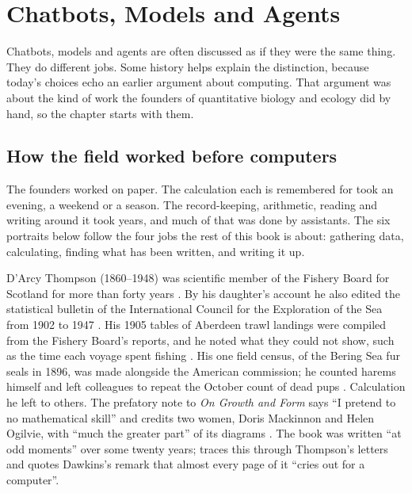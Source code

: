 \chapter{Chatbots, Models and Agents}
\label{ch:landscape}

Chatbots, models and agents are often discussed as if they were the same thing.
They do different jobs. Some history helps explain the distinction, because
today's choices echo an earlier argument about computing. That argument was
about the kind of work the founders of quantitative biology and ecology did by
hand, so the chapter starts with them.

\section{How the field worked before computers}

The founders worked on paper. The calculation each is remembered for took an
evening, a weekend or a season. The record-keeping, arithmetic, reading and
writing around it took years, and much of that was done by assistants. The six
portraits below follow the four jobs the rest of this book is about: gathering
data, calculating, finding what has been written, and writing it up.

D'Arcy Thompson (1860--1948) was scientific member of the Fishery Board for
Scotland for more than forty years \parencite{lt1958scholarnaturalist}. By his
daughter's account he also edited the statistical bulletin of the International
Council for the Exploration of the Sea from 1902 to 1947
\parencite{thompsonr1976dsb}. His 1905 tables of Aberdeen trawl landings were
compiled from the Fishery Board's reports, and he noted what they could not
show, such as the time each voyage spent fishing
\parencite{thompson1905aberdeen}. His one field census, of the Bering Sea fur
seals in 1896, was made alongside the American commission; he counted harems
himself and left colleagues to repeat the October count of dead pups
\parencite{thompson1897beringsea}. Calculation he left to others. The prefatory
note to \emph{On Growth and Form} says ``I pretend to no mathematical skill''
and credits two women, Doris Mackinnon and Helen Ogilvie, with ``much the
greater part'' of its diagrams \parencite{thompson1917growthform}. The book was
written ``at odd moments'' over some twenty years;
\textcite{jarron2023growthform} traces this through Thompson's letters and
quotes Dawkins's remark that almost every page of it ``cries out for a
computer''.

